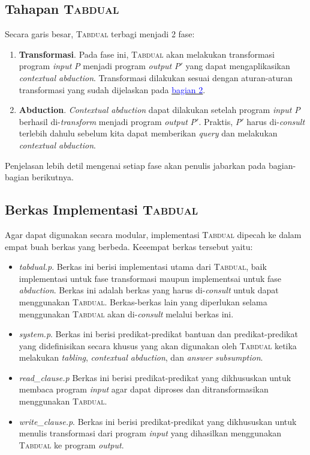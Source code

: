 \subsection{Tahapan \textsc{Tabdual}}

Secara garis besar, \textsc{Tabdual} terbagi menjadi 2 fase:

\begin{enumerate}
	\item \textbf{Transformasi}. Pada fase ini, \textsc{Tabdual} akan melakukan transformasi program \textit{input} \textit{P} menjadi program \textit{output} \textit{P$'$} yang dapat mengaplikasikan \textit{contextual abduction}. Transformasi dilakukan sesuai dengan aturan-aturan transformasi yang sudah dijelaskan pada \hyperref[bab2]{\textcolor{blue}{bagian 2}}.
	\item \textbf{Abduction}. \textit{Contextual abduction} dapat dilakukan setelah program \textit{input} \textit{P} berhasil di-\textit{transform} menjadi program \textit{output} \textit{P$'$}. Praktis, \textit{P$'$} harus di-\textit{consult} terlebih dahulu sebelum kita dapat memberikan \textit{query} dan melakukan \textit{contextual abduction}.
\end{enumerate}

Penjelasan lebih detil mengenai setiap fase akan penulis jabarkan pada bagian-bagian berikutnya.

\subsection{Berkas Implementasi \textsc{Tabdual}}
Agar dapat digunakan secara modular, implementasi \textsc{Tabdual} dipecah ke dalam empat buah berkas yang berbeda. Keeempat berkas tersebut yaitu:

\begin{itemize}
	\item \textit{tabdual.p}. Berkas ini berisi implementasi utama dari \textsc{Tabdual}, baik implementasi untuk fase transformasi maupun implementsai untuk fase \textit{abduction}. Berkas ini adalah berkas yang harus di-\textit{consult} untuk dapat menggunakan \textsc{Tabdual}. Berkas-berkas lain yang diperlukan selama menggunakan \textsc{Tabdual} akan di-\textit{consult} melalui berkas ini.
	\item \textit{system.p}. Berkas ini berisi predikat-predikat bantuan dan predikat-predikat yang didefinisikan secara khusus yang akan digunakan  oleh \textsc{Tabdual} ketika melakukan \textit{tabling}, \textit{contextual abduction}, dan \textit{answer subsumption}. 
	\item \textit{read\_clause.p} Berkas ini berisi predikat-predikat yang dikhususkan untuk membaca program \textit{input} agar dapat diproses dan ditransformasikan menggunakan \textsc{Tabdual}.
	\item \textit{write\_clause.p}. Berkas ini berisi predikat-predikat yang dikhususkan untuk menulis transformasi dari program \textit{input} yang dihasilkan menggunakan \textsc{Tabdual} ke program \textit{output}.
\end{itemize}


